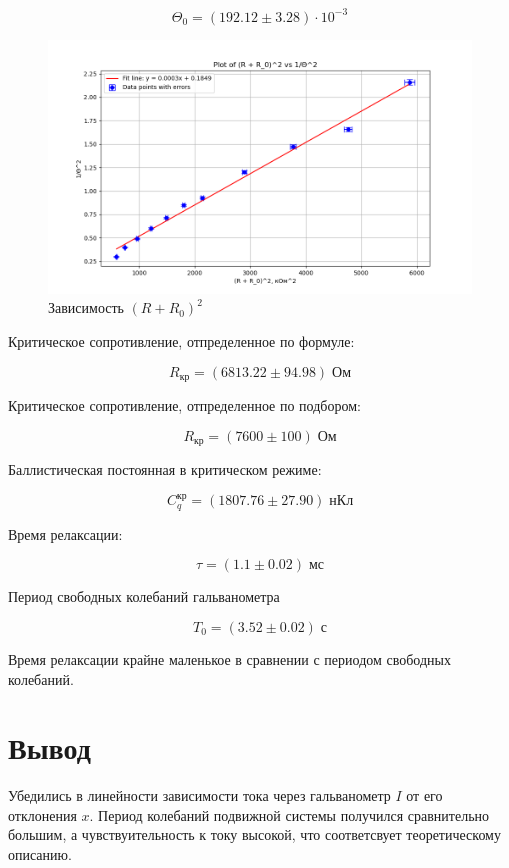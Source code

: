 \documentclass[a4paper, 12pt]{article}
\begin{document}
\begin{equation}
    \Theta_0  = (192.12 \pm 3.28) \cdot 10^{-3}
\end{equation}

\begin{figure}[H]
    \captionsetup{position=above, skip=2pt}
    \centering
    \caption{Зависимость $(R+R_0)^2$}
    \includegraphics[width=\textwidth]{theta_R/graph.png}
\end{figure}


Критическое сопротивление, отпределенное по формуле:

\begin{equation}
    R_{\text{кр}} = (6813.22 \pm 94.98) \; \text{Ом}
\end{equation}

Критическое сопротивление, отпределенное по подбором:

\begin{equation}
    R_{\text{кр}} = (7600 \pm 100) \; \text{Ом}
\end{equation}

Баллистическая постоянная в критическом режиме:

\begin{equation}
    C^{\text{кр}}_q  = (1807.76 \pm 27.90) \; \text{нКл}
\end{equation}

Время релаксации:

\begin{equation}
    \tau =  (1.1 \pm 0.02) \; \text{мс}
\end{equation}


Период свободных колебаний гальванометра

\begin{equation}
    T_0 = (3.52 \pm 0.02) \; \text{с}
\end{equation}

Время релаксации крайне маленькое в сравнении с периодом свободных колебаний.


\section*{Вывод}

Убедились в линейности зависимости тока через гальванометр $I$ от его отклонения $x$.
Период колебаний подвижной системы получился сравнительно большим, а чувствуительность к току высокой, что соответсвует теоретическому описанию.
\end{document}
